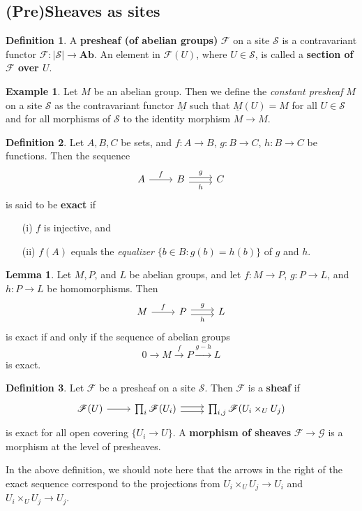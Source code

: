 \documentclass[oneside]{amsart}
\theoremstyle{definition}
\newtheorem{defi}{Definition}[section]
\newtheorem{lemma}{Lemma}[section]
\newtheorem{ex}{Example}[section]
\begin{document}
\subsection{(Pre)Sheaves as sites}
\begin{defi}
A \textbf{presheaf (of abelian groups)} $\mathscr F$ on a site $\mathcal S$ is a contravariant functor $\mathscr F \colon |\mathcal S| \to \mathbf{Ab}$. An element in $\mathscr F(U)$, where $U \in \mathcal S$, is called a \textbf{section of $\mathscr F$ over $U$}. 
\end{defi}
\begin{ex}
Let $M$ be an abelian group. Then we define the \textit{constant presheaf} $M$ on a site $\mathcal S$ as the contravariant functor $\underline{M}$ such that $\underline{M} (U) = M$ for all $U \in \mathcal S$ and for all morphisms of $\mathcal S$ to the identity morphism $M \to M$. 
\end{ex}
\begin{defi}
Let $A, B,C$ be sets, and $f \colon A \to B$, $g \colon B\to C$, $h \colon B \to C$ be functions. Then the sequence 
\[
\begin{tikzcd}
A \arrow[r, "f"] & B \arrow[r, "g", shift left] \arrow[r, "h"', shift right] & C
\end{tikzcd} 
\] is said to be \textbf{exact} if 
\begin{itemize}
	\item [(i)] $f$ is injective, and
	\item [(ii)] $f(A)$ equals the \textit{equalizer} $\{ b \in B \colon g(b) = h(b) \}$ of $g$ and $h$.
\end{itemize}
\end{defi}
\begin{lemma} Let $M, P$, and $L$ be abelian groups, and let $f \colon M \to P$, $g \colon P \to L$, and $h \colon P \to L$ be homomorphisms. Then 
\[
\begin{tikzcd}
M \arrow[r, "f"] & P \arrow[r, "g", shift left] \arrow[r, "h"', shift right] & L
\end{tikzcd} 
\] 
is exact if and only if the sequence of abelian groups
\[
0 \to M \xrightarrow {f}  P \xrightarrow{g-h} L 
\] is exact.
\end{lemma}
\begin{defi}
Let $\mathscr F$ be a presheaf on a site $\mathcal S$. Then $\mathscr F$ is a \textbf{sheaf} if 
\begin{equation}
	\begin{tikzcd}
\mathscr F(U) \arrow[r] & \prod_i \mathscr F(U_i)  \arrow[r, shift left] \arrow[r, shift right] & \prod_{i, j} \mathscr F(U_i \times_U U_j)
\end{tikzcd} 
\end{equation} is exact for all open covering $\{U_i \to U \}$. A \textbf{morphism of sheaves} $\mathscr F \to \mathscr G$ is a morphism at the level of presheaves. 
\end{defi}
In the above definition, we should note here that the arrows in the right of the exact sequence correspond to the projections from $U_i \times_U U_j \to  U_i$ and $U_i \times_U U_j \to  U_j$. 
\end{document}
